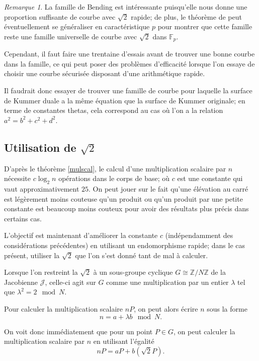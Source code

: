 \documentclass[a4paper,12pt]{article}
\theoremstyle{definition}
\theoremstyle{remark}
\newtheorem{remarque}{Remarque}
\numberwithin{equation}{section}
\begin{document}
\begin{remarque}
La famille de Bending est intéressante puisqu'elle nous donne une proportion suffisante de courbe avec $\sqrt{2}$ rapide; de plus, le théorème de \citep{bending} peut éventuellement se généraliser en caractéristique $p$ pour montrer que cette famille reste une famille universelle de courbe avec $\sqrt{2}$ dans $\mathbb{F}_p$.

Cependant, il faut faire une trentaine d'essais avant de trouver une bonne courbe dans la famille, ce qui peut poser des problèmes d'efficacité lorsque l'on essaye de choisir une courbe sécurisée disposant d'une arithmétique rapide.

Il faudrait donc essayer de trouver une famille de courbe pour laquelle la surface de Kummer duale a la même équation que la surface de Kummer originale; en terme de constantes thetas, cela correspond au cas où l'on a la relation $a^2 = b^2 + c^2 + d^2$.
\end{remarque}


\subsection{Utilisation de \texorpdfstring{$\sqrt{2}$}{sqrt2}}

D'après le théorème \ref{mulscal}, le calcul d'une multiplication scalaire par $n$ nécessite $c \log_2 n$ opérations dans le corps de base; où $c$ est une constante qui vaut approximativement $25$. On peut jouer sur le fait qu'une élévation au carré est légèrement moins couteuse qu'un produit ou qu'un produit par une petite constante est beaucoup moins couteux pour avoir des résultats plus précis dans certains cas.

L'objectif est maintenant d'améliorer la constante $c$ (indépendamment des considérations précédentes) en utilisant un endomorphisme rapide; dans le cas présent, utiliser la $\sqrt{2}$ que l'on s'est donné tant de mal à calculer.

Lorsque l'on restreint la $\sqrt{2}$ à un sous-groupe cyclique $G \cong \mathbb{Z}/N\mathbb{Z}$ de la Jacobienne $\mathcal{J}$, celle-ci agit sur $G$ comme une multiplication par un entier $\lambda$ tel que $\lambda^2 = 2 \mod N$.

Pour calculer la multiplication scalaire $nP$, on peut alors écrire $n$ sous la forme
$$ n = a + \lambda b \mod N .$$

On voit donc immédiatement que pour un point $P \in G$, on peut calculer la multiplication scalaire par $n$ en utilisant l'égalité
$$nP = aP + b(\sqrt{2}P) .$$
\end{document}
